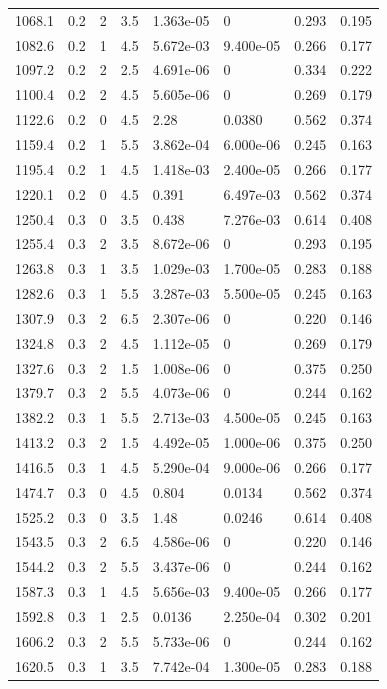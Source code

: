 \documentclass[preview]{standalone}
\begin{document}
{{{\begin{tabular}{L{1.2cm}C{1.2cm} C{0.3cm}C{0.5cm} C{1.4cm}C{1.4cm} C{1.4cm}C{1.4cm}}
  1068.1  &   0.2  & 2     & 3.5 &  1.363e-05  & 0  & 0.293 &  0.195   \\ 
  1082.6  &   0.2  & 1     & 4.5 &  5.672e-03  & 9.400e-05  & 0.266 &  0.177   \\ 
  1097.2  &   0.2  & 2     & 2.5 &  4.691e-06  & 0  & 0.334 &  0.222   \\ 
  1100.4  &   0.2  & 2     & 4.5 &  5.605e-06  & 0  & 0.269 &  0.179   \\ 
  1122.6  &   0.2  & 0     & 4.5 &  2.28  & 0.0380  & 0.562 &  0.374   \\ 
  1159.4  &   0.2  & 1     & 5.5 &  3.862e-04  & 6.000e-06  & 0.245 &  0.163   \\ 
  1195.4  &   0.2  & 1     & 4.5 &  1.418e-03  & 2.400e-05  & 0.266 &  0.177   \\ 
  1220.1  &   0.2  & 0     & 4.5 &  0.391  & 6.497e-03  & 0.562 &  0.374   \\ 
  1250.4  &   0.3  & 0     & 3.5 &  0.438  & 7.276e-03  & 0.614 &  0.408   \\ 
  1255.4  &   0.3  & 2     & 3.5 &  8.672e-06  & 0  & 0.293 &  0.195   \\ 
  1263.8  &   0.3  & 1     & 3.5 &  1.029e-03  & 1.700e-05  & 0.283 &  0.188   \\ 
  1282.6  &   0.3  & 1     & 5.5 &  3.287e-03  & 5.500e-05  & 0.245 &  0.163   \\ 
  1307.9  &   0.3  & 2     & 6.5 &  2.307e-06  & 0  & 0.220 &  0.146   \\ 
  1324.8  &   0.3  & 2     & 4.5 &  1.112e-05  & 0  & 0.269 &  0.179   \\ 
  1327.6  &   0.3  & 2     & 1.5 &  1.008e-06  & 0  & 0.375 &  0.250   \\ 
  1379.7  &   0.3  & 2     & 5.5 &  4.073e-06  & 0  & 0.244 &  0.162   \\ 
  1382.2  &   0.3  & 1     & 5.5 &  2.713e-03  & 4.500e-05  & 0.245 &  0.163   \\ 
  1413.2  &   0.3  & 2     & 1.5 &  4.492e-05  & 1.000e-06  & 0.375 &  0.250   \\ 
  1416.5  &   0.3  & 1     & 4.5 &  5.290e-04  & 9.000e-06  & 0.266 &  0.177   \\ 
  1474.7  &   0.3  & 0     & 4.5 &  0.804  & 0.0134  & 0.562 &  0.374   \\ 
  1525.2  &   0.3  & 0     & 3.5 &  1.48  & 0.0246  & 0.614 &  0.408   \\ 
  1543.5  &   0.3  & 2     & 6.5 &  4.586e-06  & 0  & 0.220 &  0.146   \\ 
  1544.2  &   0.3  & 2     & 5.5 &  3.437e-06  & 0  & 0.244 &  0.162   \\ 
  1587.3  &   0.3  & 1     & 4.5 &  5.656e-03  & 9.400e-05  & 0.266 &  0.177   \\ 
  1592.8  &   0.3  & 1     & 2.5 &  0.0136  & 2.250e-04  & 0.302 &  0.201   \\ 
  1606.2  &   0.3  & 2     & 5.5 &  5.733e-06  & 0  & 0.244 &  0.162   \\ 
  1620.5  &   0.3  & 1     & 3.5 &  7.742e-04  & 1.300e-05  & 0.283 &  0.188   \\ 
\hline 
\end{tabular} 

}}}
\end{document}
